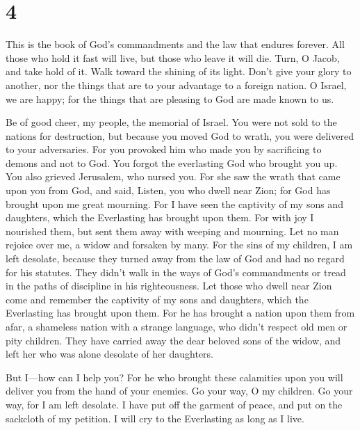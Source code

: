 \hypertarget{section-3}{%
\section{4}\label{section-3}}

 This is the book of God's commandments and the law that
endures forever. All those who hold it fast will live, but those who
leave it will die.  Turn, O Jacob, and take hold of it.
Walk toward the shining of its light.  Don't give your
glory to another, nor the things that are to your advantage to a foreign
nation.  O Israel, we are happy; for the things that are
pleasing to God are made known to us.

 Be of good cheer, my people, the memorial of Israel.
 You were not sold to the nations for destruction, but
because you moved God to wrath, you were delivered to your adversaries.
 For you provoked him who made you by sacrificing to
demons and not to God.  You forgot the everlasting God who
brought you up. You also grieved Jerusalem, who nursed you.
 For she saw the wrath that came upon you from God, and
said, Listen, you who dwell near Zion; for God has brought upon me great
mourning.  For I have seen the captivity of my sons and
daughters, which the Everlasting has brought upon them. 
For with joy I nourished them, but sent them away with weeping and
mourning.  Let no man rejoice over me, a widow and
forsaken by many. For the sins of my children, I am left desolate,
because they turned away from the law of God  and had no
regard for his statutes. They didn't walk in the ways of God's
commandments or tread in the paths of discipline in his righteousness.
 Let those who dwell near Zion come and remember the
captivity of my sons and daughters, which the Everlasting has brought
upon them.  For he has brought a nation upon them from
afar, a shameless nation with a strange language, who didn't respect old
men or pity children.  They have carried away the dear
beloved sons of the widow, and left her who was alone desolate of her
daughters.

 But I---how can I help you?  For he who
brought these calamities upon you will deliver you from the hand of your
enemies.  Go your way, O my children. Go your way, for I
am left desolate.  I have put off the garment of peace,
and put on the sackcloth of my petition. I will cry to the Everlasting
as long as I live.

